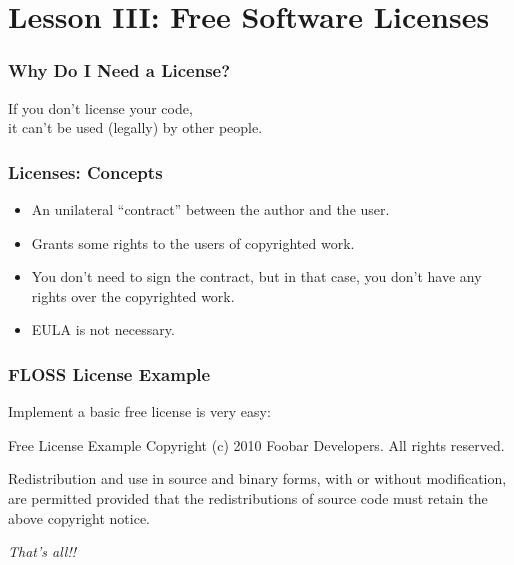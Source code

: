 

\section{Lesson III: Free Software Licenses}





\begin{frame}
\frametitle{Why Do I Need a License?}

\pause

\begin{center}
\Large{If you don't license your code,\\ it can't be used (legally) by other people.}
\end{center}

\end{frame}





\begin{frame}
\frametitle{Licenses: Concepts}

\begin{itemize}
\item An unilateral ``contract'' between the author and the user.
\item Grants some rights to the users of copyrighted work.
\item You don't need to sign the contract, but in that case, you don't have
any rights over the copyrighted work. 
\item EULA is not necessary.
\end{itemize}

\end{frame}




\begin{frame}
\frametitle{FLOSS License Example}

Implement a basic free license is very easy: 

\begin{block}{Free License Example}
Copyright (c) 2010 Foobar Developers. All rights reserved. 

\medskip
Redistribution and use in source and binary forms, with or without modification, are permitted provided that the redistributions of source code must retain the above copyright notice.
\end{block}

\textit{That's all!!}

\end{frame}


